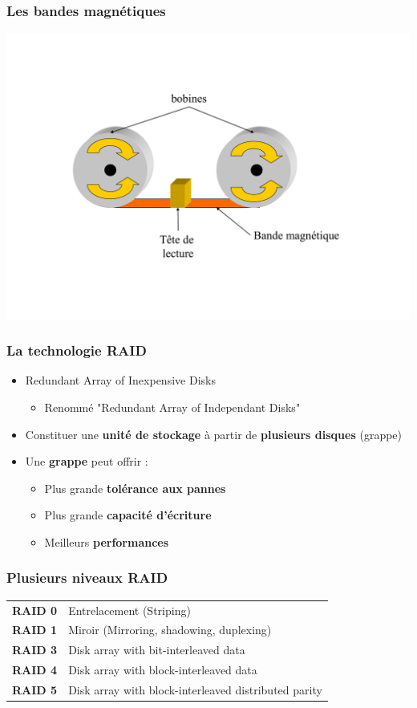 \begin{frame}
\frametitle{Les bandes magnétiques}
\begin{center}
\includegraphics[height=0.8\textheight]{../illustration/bande.pdf}
\end{center}
\end{frame}


\begin{frame}
\frametitle{La technologie RAID}
\begin{itemize}
\item Redundant Array of Inexpensive Disks
\begin{itemize}
\item Renommé "Redundant Array of Independant Disks"
\end{itemize}

\item Constituer une \textbf{unité de stockage} à partir de \textbf{plusieurs disques} (grappe)
\item Une \textbf{grappe} peut offrir :
\begin{itemize}
\item Plus grande \textbf{tolérance aux pannes}
\item Plus grande \textbf{capacité d'écriture}
\item Meilleurs \textbf{performances}
\end{itemize}
\end{itemize}
\end{frame}

\begin{frame}
\frametitle{Plusieurs niveaux RAID}
\begin{tabular}{c|l}
\textbf{RAID 0} & Entrelacement (Striping) \\
\textbf{RAID 1} & Miroir (Mirroring, shadowing, duplexing) \\
\textbf{RAID 3} & Disk array with bit-interleaved data \\
\textbf{RAID 4} & Disk array with block-interleaved data \\
\textbf{RAID 5} & Disk array with block-interleaved distributed parity \\
\end{tabular}
\end{frame}


